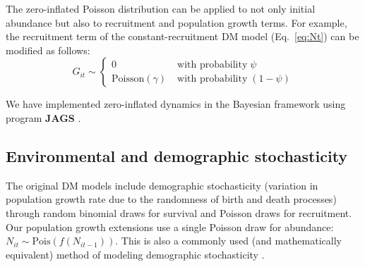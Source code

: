 \documentclass[12pt]{article}
\begin{document}

The zero-inflated Poisson distribution can be applied to not only
initial abundance but also to recruitment and population growth
terms. For example, the recruitment term of the constant-recruitment DM model
(Eq.~\ref{eq:Nt}) can be modified as follows:
\begin{equation}
G_{it} \sim \left\{
\begin{aligned}
0 &\; \text{with probability} \; \psi \\
\mathrm{Poisson}(\gamma) &\; \text{with probability} \; (1-\psi)\end{aligned} \right.
\label{eq:ZIPts}
\end{equation}

We have implemented
zero-inflated dynamics in the Bayesian framework using program
\textbf{JAGS} \citep[version 3.2.0]{plummer:2003}.


\subsection{Environmental and demographic stochasticity}

The original DM models include demographic stochasticity (variation in population growth 
rate due to the randomness of birth and death processes) through random 
binomial draws for survival and Poisson draws for recruitment.  Our population
growth extensions use a single Poisson draw for abundance: $N_{it} \sim 
\text{Pois}(f(N_{it-1}))$.  This is also a commonly used (and mathematically equivalent) 
method of modeling demographic stochasticity 
\citep{bonsall_hastings:2004,melbourne_hastings:2008}.  
\end{document}
